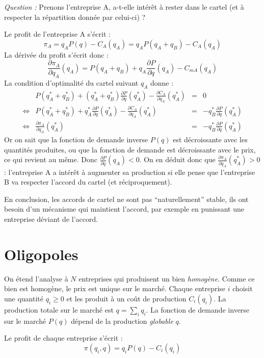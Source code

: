 \documentclass[
  a4paper,
]{book}
\theoremstyle{definition}
\theoremstyle{definition}
\theoremstyle{definition}
\theoremstyle{definition}
\theoremstyle{remark}
\begin{document}
\emph{Question :} Prenons l'entreprise A, a-t-elle intérêt à rester dans le cartel (et à respecter la répartition donnée par celui-ci) ?

Le profit de l'entreprise A s'écrit :
\[
\pi_A=q_AP(q)-C_A(q_A)=q_AP(q_A+q_B)-C_A(q_A)
\]
La dérivée du profit s'écrit donc :
\[
\frac{\partial\pi_A}{\partial q_A}(q_A)=P(q_A+q_B)+q_A\frac{\partial P}{\partial q}(q_A)-C_{mA}(q_A)
\]
La condition d'optimalité du cartel suivant \(q_A\) donne :
\[
\begin{array}{crcl}
& P(q_A^*+q_B^*) + (q_A^*+q_B^*)\frac{\partial P}{\partial q}(q_A^*)-\frac{\partial C_A}{\partial q_A}(q_A^*)& = &0\\
\Leftrightarrow &  P(q_A^*+q_B^*) + q_A^*\frac{\partial P}{\partial q}(q_A^*)-\frac{\partial C_A}{\partial q_A}(q_A^*)& = &-q_B^*\frac{\partial P}{\partial q}(q_A^*)\\
\Leftrightarrow & \frac{\partial\pi_A}{\partial q_A}(q_A^*)& =  &-q_B^*\frac{\partial P}{\partial q}(q_A^*)
 \end{array}
\]
Or on sait que la fonction de demande inverse \(P(q)\) est décroissante avec les quantités produites, ou que la fonction de demande est décroissante avec le prix, ce qui revient au même.
Donc \(\frac{\partial P}{\partial q}(q_A)<0\).
On en déduit donc que \(\frac{\partial\pi_A}{\partial q_A}(q_A^*)>0\) : l'entreprise A a intérêt à augmenter sa production si elle pense que l'entreprise B va respecter l'accord du cartel (et réciproquement).

En conclusion, les accords de cartel ne sont pas ``naturellement'' stable, ils ont besoin d'un mécanisme qui maintient l'accord, par exemple en punissant une entreprise déviant de l'accord.

\hypertarget{oligopoles-1}{%
\section{Oligopoles}\label{oligopoles-1}}

On étend l'analyse à \(N\) entreprises qui produisent un bien \emph{homogène}.
Comme ce bien est homogène, le prix est unique sur le marché.
Chaque entreprise \(i\) choisit une quantité \(q_i\geq 0\) et les produit à un coût de production \(C_i(q_i)\).
La production totale sur le marché est \(q=\sum_i q_i\).
La fonction de demande inverse sur le marché \(P(q)\) dépend de la production \emph{globable} \(q\).

Le profit de chaque entreprise s'écrit :
\[
\pi(q_i, q) = q_iP(q) -C_i(q_i)
\]
\end{document}
